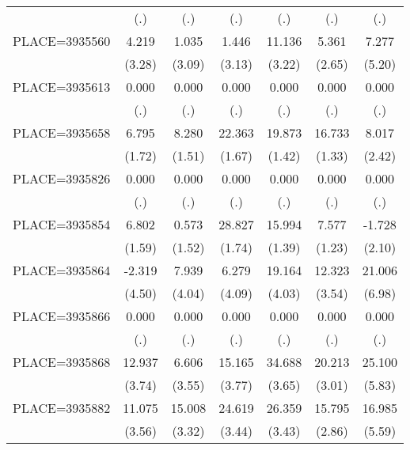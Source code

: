 {\begin{tabular}{l*{6}{c}}
                    &         (.)&         (.)&         (.)&         (.)&         (.)&         (.)\\
PLACE=3935560       &       4.219&       1.035&       1.446&      11.136&       5.361&       7.277\\
                    &      (3.28)&      (3.09)&      (3.13)&      (3.22)&      (2.65)&      (5.20)\\
PLACE=3935613       &       0.000&       0.000&       0.000&       0.000&       0.000&       0.000\\
                    &         (.)&         (.)&         (.)&         (.)&         (.)&         (.)\\
PLACE=3935658       &       6.795&       8.280&      22.363&      19.873&      16.733&       8.017\\
                    &      (1.72)&      (1.51)&      (1.67)&      (1.42)&      (1.33)&      (2.42)\\
PLACE=3935826       &       0.000&       0.000&       0.000&       0.000&       0.000&       0.000\\
                    &         (.)&         (.)&         (.)&         (.)&         (.)&         (.)\\
PLACE=3935854       &       6.802&       0.573&      28.827&      15.994&       7.577&      -1.728\\
                    &      (1.59)&      (1.52)&      (1.74)&      (1.39)&      (1.23)&      (2.10)\\
PLACE=3935864       &      -2.319&       7.939&       6.279&      19.164&      12.323&      21.006\\
                    &      (4.50)&      (4.04)&      (4.09)&      (4.03)&      (3.54)&      (6.98)\\
PLACE=3935866       &       0.000&       0.000&       0.000&       0.000&       0.000&       0.000\\
                    &         (.)&         (.)&         (.)&         (.)&         (.)&         (.)\\
PLACE=3935868       &      12.937&       6.606&      15.165&      34.688&      20.213&      25.100\\
                    &      (3.74)&      (3.55)&      (3.77)&      (3.65)&      (3.01)&      (5.83)\\
PLACE=3935882       &      11.075&      15.008&      24.619&      26.359&      15.795&      16.985\\
                    &      (3.56)&      (3.32)&      (3.44)&      (3.43)&      (2.86)&      (5.59)\\

\end{tabular}}
